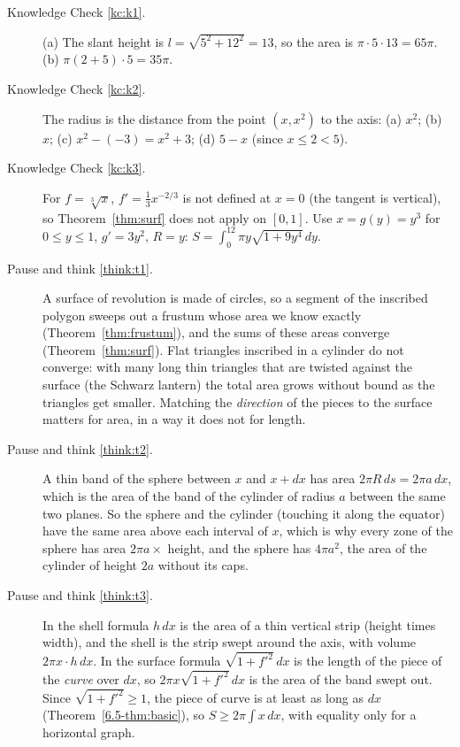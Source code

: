 \documentclass[11pt]{article}
\begin{document}
\begin{description}

  \item[Knowledge Check \ref{kc:k1}.] (a) The slant height is $l=\sqrt{5^2+12^2}=13$, so the area is $\pi\cdot5\cdot13=65\pi$. (b) $\pi(2+5)\cdot5=35\pi$.

  \item[Knowledge Check \ref{kc:k2}.] The radius is the distance from the point $(x,x^2)$ to the axis: (a) $x^2$; (b) $x$; (c) $x^2-(-3)=x^2+3$; (d) $5-x$ (since $x\le2<5$).

  \item[Knowledge Check \ref{kc:k3}.] For $f=\sqrt[3]x$, $f'=\frac13x^{-2/3}$ is not defined at $x=0$ (the tangent is vertical), so Theorem~\ref{thm:surf} does not apply on $[0,1]$. Use $x=g(y)=y^3$ for $0\le y\le1$, $g'=3y^2$, $R=y$: $S=\int_0^12\pi y\sqrt{1+9y^4}\,dy$.

  \item[Pause and think \ref{think:t1}.] A surface of revolution is made of circles, so a segment of the inscribed polygon sweeps out a frustum whose area we know exactly (Theorem~\ref{thm:frustum}), and the sums of these areas converge (Theorem~\ref{thm:surf}). Flat triangles inscribed in a cylinder do not converge: with many long thin triangles that are twisted against the surface (the Schwarz lantern) the total area grows without bound as the triangles get smaller. Matching the \emph{direction} of the pieces to the surface matters for area, in a way it does not for length.

  \item[Pause and think \ref{think:t2}.] A thin band of the sphere between $x$ and $x+dx$ has area $2\pi R\,ds=2\pi a\,dx$, which is the area of the band of the cylinder of radius $a$ between the same two planes. So the sphere and the cylinder (touching it along the equator) have the same area above each interval of $x$, which is why every zone of the sphere has area $2\pi a\times$ height, and the sphere has $4\pi a^2$, the area of the cylinder of height $2a$ without its caps.

  \item[Pause and think \ref{think:t3}.] In the shell formula $h\,dx$ is the area of a thin vertical strip (height times width), and the shell is the strip swept around the axis, with volume $2\pi x\cdot h\,dx$. In the surface formula $\sqrt{1+f'^2}\,dx$ is the length of the piece of the \emph{curve} over $dx$, so $2\pi x\sqrt{1+f'^2}\,dx$ is the area of the band swept out. Since $\sqrt{1+f'^2}\ge1$, the piece of curve is at least as long as $dx$ (Theorem~\ref{6.5-thm:basic}), so $S\ge2\pi\int x\,dx$, with equality only for a horizontal graph.
\end{description}
\end{document}
